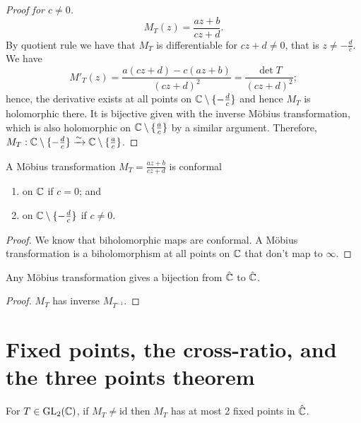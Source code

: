 
\begin{proof}[Proof for $c \neq 0$]
    \[ M_T(z) = \frac{az + b}{cz + d}. \]
    By quotient rule we have that $M_T$ is differentiable for $cz + d \neq 0$, that is $z \neq -\frac dc$. We have
    \[ M'_T(z) = \frac{a(cz + d) - c(az+b)}{(cz+d)^2} = \frac{\det{T}}{(cz+d)^2}; \]
    hence, the derivative exists at all points on $\mathbb{C} \setminus \{-\frac dc\}$ and hence $M_T$ is holomorphic there. It is bijective given with the inverse M\"obius transformation, which is also holomorphic on $\mathbb{C} \setminus \{\frac ac\}$ by a similar argument. Therefore, $M_T: \mathbb{C} \setminus \{-\frac dc\} \xrightarrow{\sim} \mathbb{C} \setminus \{ \frac ac \}$.
\end{proof}

\begin{corollary}
    A M\"obius transformation $M_T = \frac{az + b}{cz + d}$ is conformal
    \begin{enumerate}
        \item on $\mathbb{C}$ if $c = 0$; and
        \item on $\mathbb{C} \setminus \{-\frac dc\}$ if $c \neq 0$.
    \end{enumerate}
\end{corollary}

\begin{proof}
    We know that biholomorphic maps are conformal. A M\"obius transformation is a biholomorphism at all points on $\mathbb{C}$ that don't map to $\infty$. 
\end{proof}

\begin{corollary}
    Any M\"obius transformation gives a bijection from $\hat {\mathbb{C}}$ to $\hat {\mathbb{C}}$.
\end{corollary}

\begin{proof}
    $M_T$ has inverse $M_{T^{-1}}$.
\end{proof}

\section{Fixed points, the cross-ratio, and the three points theorem}

\begin{lemma}[]
    For $T \in \operatorname{GL}_2(\mathbb{C})$, if $M_T \neq \text{id}$ then $M_T$ has at most 2 fixed points in $\hat {\mathbb{C}}$.
\end{lemma}

